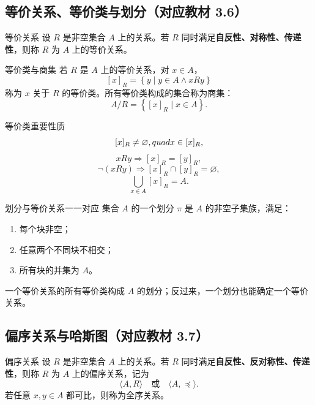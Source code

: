 \documentclass[UTF8,zihao=-4]{ctexart}
\newcommand{\kw}[1]{\textbf{\color{main}#1}}
\newcommand{\set}[1]{\left\{#1\right\}}
\begin{document}
\subsection{等价关系、等价类与划分（对应教材 3.6）}

\begin{corebox}{等价关系}
设 $R$ 是非空集合 $A$ 上的关系。若 $R$ 同时满足\kw{自反性、对称性、传递性}，则称 $R$ 为 $A$ 上的等价关系。
\end{corebox}

\begin{corebox}{等价类与商集}
若 $R$ 是 $A$ 上的等价关系，对 $x\in A$，
\[
[x]_R=\set{y\mid y\in A\land xRy}
\]
称为 $x$ 关于 $R$ 的等价类。所有等价类构成的集合称为商集：
\[
A/R=\set{[x]_R\mid x\in A}.
\]
\end{corebox}

\begin{corebox}{等价类重要性质}
\[
[x]_R\neq\varnothing,\\quad x\in[x]_R,
\]
\[
xRy\Rightarrow[x]_R=[y]_R,
\]
\[
\neg(xRy)\Rightarrow[x]_R\cap[y]_R=\varnothing,
\]
\[
\bigcup_{x\in A}[x]_R=A.
\]
\end{corebox}

\begin{corebox}{划分与等价关系一一对应}
集合 $A$ 的一个划分 $\pi$ 是 $A$ 的非空子集族，满足：
\begin{enumerate}
  \item 每个块非空；
  \item 任意两个不同块不相交；
  \item 所有块的并集为 $A$。
\end{enumerate}
一个等价关系的所有等价类构成 $A$ 的划分；反过来，一个划分也能确定一个等价关系。
\end{corebox}

\subsection{偏序关系与哈斯图（对应教材 3.7）}

\begin{corebox}{偏序关系}
设 $R$ 是非空集合 $A$ 上的关系。若 $R$ 同时满足\kw{自反性、反对称性、传递性}，则称 $R$ 为 $A$ 上的偏序关系，记为
\[
\langle A,R\rangle\quad\text{或}\quad \langle A,\preceq\rangle.
\]
若任意 $x,y\in A$ 都可比，则称为全序关系。
\end{corebox}
\end{document}
